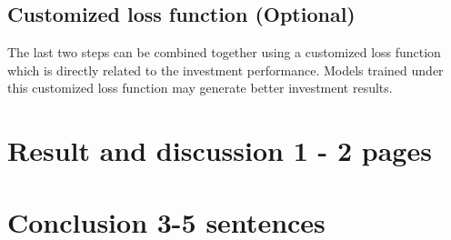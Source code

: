 \documentclass[11pt]{article}
\begin{document}
\subsection{Customized loss function (Optional)}
The last two steps can be combined together using a customized loss function which is directly related to the investment performance. Models trained under this customized loss function may generate better investment results.

\section{Result and discussion 1 - 2 pages}

\section{Conclusion 3-5 sentences}






\end{document}

